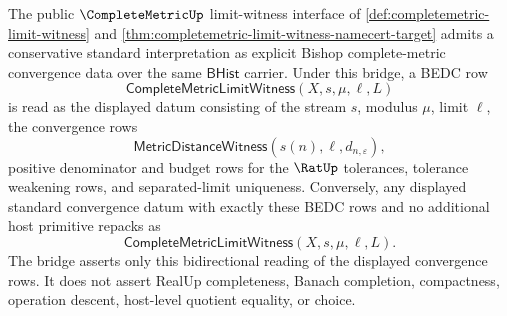 \begin{theorem}
\label{thm:completemetric-limit-witness-standard-bridge}
The public $\CompleteMetricUp$ limit-witness interface of
\autoref{def:completemetric-limit-witness} and
\autoref{thm:completemetric-limit-witness-namecert-target} admits a
conservative standard interpretation as explicit Bishop complete-metric
convergence data over the same $\mathsf{BHist}$ carrier. Under this bridge, a
BEDC row
$$
\mathsf{CompleteMetricLimitWitness}(X,s,\mu,\ell,L)
$$
is read as the displayed datum consisting of the stream $s$, modulus $\mu$,
limit $\ell$, the convergence rows
$$
\mathsf{MetricDistanceWitness}(s(n),\ell,d_{n,\varepsilon}),
$$
positive denominator and budget rows for the $\RatUp$ tolerances, tolerance
weakening rows, and separated-limit uniqueness. Conversely, any displayed
standard convergence datum with exactly these BEDC rows and no additional
host primitive repacks as
$$
\mathsf{CompleteMetricLimitWitness}(X,s,\mu,\ell,L).
$$
The bridge asserts only this bidirectional reading of the displayed convergence
rows. It does not assert RealUp completeness, Banach completion, compactness,
operation descent, host-level quotient equality, or choice.
\end{theorem}
